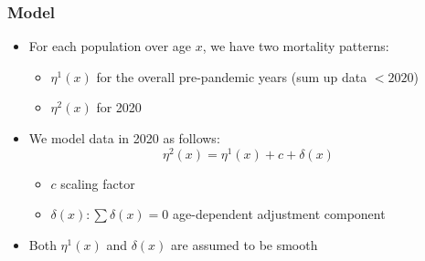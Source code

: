 \documentclass[table,xcdraw,dvipsnames]{beamer}
\begin{document}
\begin{frame}[fragile]\frametitle{Model}
	\vspace{-0.2cm}
	\begin{itemize}
		\item For each population over age $x$, we have two mortality patterns: 
		\begin{itemize}
			\item $\eta^{1}(x)$ for the overall pre-pandemic years (sum up data $<2020$)
			\item $\eta^{2}(x)$ for 2020
		\end{itemize}
	\medskip
		 \item We model data in 2020 as follows:
		 $$
		 \eta^{2}(x) = \eta^{1}(x) + c + \delta(x)
		 $$
		 \begin{itemize}
		 	\item $c$ scaling factor
		 	\item $\delta(x) : \sum \delta(x) = 0$ age-dependent adjustment component
		 \end{itemize}
	 \medskip
	 \item Both $\eta^{1}(x)$ and $\delta(x)$ are assumed to be smooth
	\end{itemize}	
\end{frame}
\end{document}
